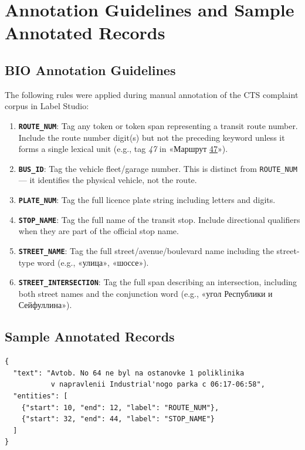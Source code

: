 %
%
\chapter{Annotation Guidelines and Sample Annotated Records}
\label{app:annotation}

\section{BIO Annotation Guidelines}

The following rules were applied during manual annotation of the CTS complaint corpus in Label Studio:

\begin{enumerate}
  \item \textbf{\texttt{ROUTE\_NUM}}: Tag any token or token span representing a transit route number. Include the route number digit(s) but not the preceding keyword unless it forms a single lexical unit (e.g., tag \textit{47} in \foreignlanguage{russian}{«Маршрут \underline{47}»}).
  \item \textbf{\texttt{BUS\_ID}}: Tag the vehicle fleet/garage number. This is distinct from \texttt{ROUTE\_NUM} — it identifies the physical vehicle, not the route.
  \item \textbf{\texttt{PLATE\_NUM}}: Tag the full licence plate string including letters and digits.
  \item \textbf{\texttt{STOP\_NAME}}: Tag the full name of the transit stop. Include directional qualifiers when they are part of the official stop name.
  \item \textbf{\texttt{STREET\_NAME}}: Tag the full street/avenue/boulevard name including the street-type word (e.g., \foreignlanguage{russian}{«улица»}, \foreignlanguage{russian}{«шоссе»}).
  \item \textbf{\texttt{STREET\_INTERSECTION}}: Tag the full span describing an intersection, including both street names and the conjunction word (e.g., \foreignlanguage{russian}{«угол Республики и Сейфуллина»}).
\end{enumerate}

\section{Sample Annotated Records}

\begin{lstlisting}[caption={Sample annotated record (JSONL format).},label={lst:sample}]
{
  "text": "Avtob. No 64 ne byl na ostanovke 1 poliklinika 
           v napravlenii Industrial'nogo parka c 06:17-06:58",
  "entities": [
    {"start": 10, "end": 12, "label": "ROUTE_NUM"},
    {"start": 32, "end": 44, "label": "STOP_NAME"}
  ]
}
\end{lstlisting}

